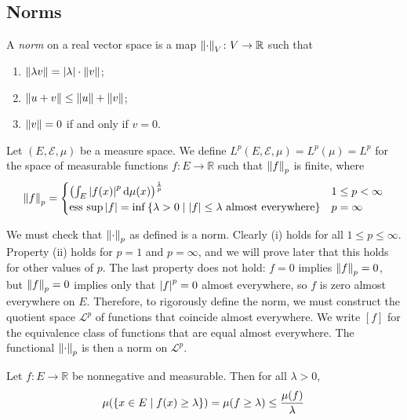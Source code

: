 \subsection{Norms}
\begin{definition}
	A \emph{norm} on a real vector space is a map \( \norm{\cdot}_V \colon V \to \mathbb R \) such that
	\begin{enumerate}
		\item \( \norm{\lambda v} = \abs{\lambda} \cdot \norm{v} \);
		\item \( \norm{u + v} \leq \norm{u} + \norm{v} \);
		\item \( \norm{v} = 0 \) if and only if \( v = 0 \).
	\end{enumerate}
\end{definition}
\begin{definition}
	Let \( (E, \mathcal E, \mu) \) be a measure space.
	We define \( L^p(E,\mathcal E,\mu) = L^p(\mu) = L^p \) for the space of measurable functions \( f \colon E \to \mathbb R \) such that \( \norm{f}_p \) is finite, where
	\[ \norm{f}_p = \begin{cases}
		\qty(\int_E \abs{f(x)}^p \dd{\mu(x)})^{\frac{1}{p}} & 1 \leq p < \infty \\
		\operatorname*{ess\ sup} \abs{f} = \inf \qty{\lambda > 0 \mid \abs{f} \leq \lambda \text{ almost everywhere}} & p = \infty
	\end{cases} \]
\end{definition}
We must check that \( \norm{\cdot}_p \) as defined is a norm.
Clearly (i) holds for all \( 1 \leq p \leq \infty \).
Property (ii) holds for \( p = 1 \) and \( p = \infty \), and we will prove later that this holds for other values of \( p \).
The last property does not hold: \( f = 0 \) implies \( \norm{f}_p = 0 \), but \( \norm{f}_p = 0 \) implies only that \( \abs{f}^p = 0 \) almost everywhere, so \( f \) is zero almost everywhere on \( E \).
Therefore, to rigorously define the norm, we must construct the quotient space \( \mathcal L^p \) of functions that coincide almost everywhere.
We write \( [f] \) for the equivalence class of functions that are equal almost everywhere.
The functional \( \norm{\cdot}_p \) is then a norm on \( \mathcal L^p \).
\begin{proposition}
	Let \( f \colon E \to \mathbb R \) be nonnegative and measurable.
	Then for all \( \lambda > 0 \),
	\[ \mu(\qty{x \in E \mid f(x) \geq \lambda}) = \mu(f \geq \lambda) \leq \frac{\mu(f)}{\lambda} \]
\end{proposition}
